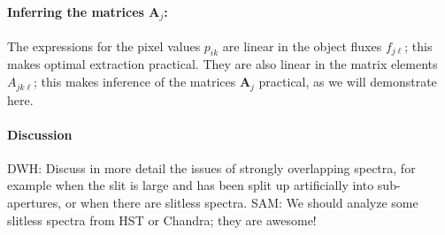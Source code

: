 \documentclass[12pt]{article}
\newcommand{\hmatrix}[1]{\boldsymbol{#1}}
\newcommand{\Amatrix}{\hmatrix{A}}
\begin{document}
\paragraph{Inferring the matrices $\Amatrix_j$:}
The expressions for the pixel values $p_{ik}$ are linear in the object
fluxes $f_{j\ell}$; this makes optimal extraction practical.  They are
also linear in the matrix elements $A_{jk\ell}$; this makes inference
of the matrices $\Amatrix_j$ practical, as we will demonstrate here.

\paragraph{Discussion}
DWH: Discuss in more detail the issues of strongly overlapping
spectra, for example when the slit is large and has been split up
artificially into sub-apertures, or when there are slitless spectra.
SAM: We should analyze some slitless spectra from HST or Chandra; they
are awesome!
\end{document}
